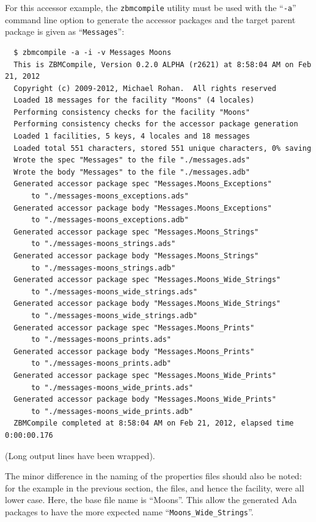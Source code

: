 For this accessor example, the \texttt{zbmcompile} utility must be used with
the ``\texttt{-a}'' command line option to generate the accessor packages and
the target parent package is given as ``\texttt{Messages}'':
\begin{xmpl}
\begin{verbatim}
  $ zbmcompile -a -i -v Messages Moons
  This is ZBMCompile, Version 0.2.0 ALPHA (r2621) at 8:58:04 AM on Feb 21, 2012
  Copyright (c) 2009-2012, Michael Rohan.  All rights reserved
  Loaded 18 messages for the facility "Moons" (4 locales)
  Performing consistency checks for the facility "Moons"
  Performing consistency checks for the accessor package generation
  Loaded 1 facilities, 5 keys, 4 locales and 18 messages
  Loaded total 551 characters, stored 551 unique characters, 0% saving
  Wrote the spec "Messages" to the file "./messages.ads"
  Wrote the body "Messages" to the file "./messages.adb"
  Generated accessor package spec "Messages.Moons_Exceptions"
      to "./messages-moons_exceptions.ads"
  Generated accessor package body "Messages.Moons_Exceptions"
      to "./messages-moons_exceptions.adb"
  Generated accessor package spec "Messages.Moons_Strings"
      to "./messages-moons_strings.ads"
  Generated accessor package body "Messages.Moons_Strings"
      to "./messages-moons_strings.adb"
  Generated accessor package spec "Messages.Moons_Wide_Strings"
      to "./messages-moons_wide_strings.ads"
  Generated accessor package body "Messages.Moons_Wide_Strings"
      to "./messages-moons_wide_strings.adb"
  Generated accessor package spec "Messages.Moons_Prints"
      to "./messages-moons_prints.ads"
  Generated accessor package body "Messages.Moons_Prints"
      to "./messages-moons_prints.adb"
  Generated accessor package spec "Messages.Moons_Wide_Prints"
      to "./messages-moons_wide_prints.ads"
  Generated accessor package body "Messages.Moons_Wide_Prints"
      to "./messages-moons_wide_prints.adb"
  ZBMCompile completed at 8:58:04 AM on Feb 21, 2012, elapsed time 0:00:00.176
\end{verbatim}
\end{xmpl}
(Long output lines have been wrapped).

The minor difference in the naming of the properties files should also be
noted: for the example in the previous section, the files, and hence the
facility, were all lower case.  Here, the base file name is ``Moons''.
This allow the generated Ada packages to have the more expected name
``\texttt{Moons\_Wide\_Strings}''.

